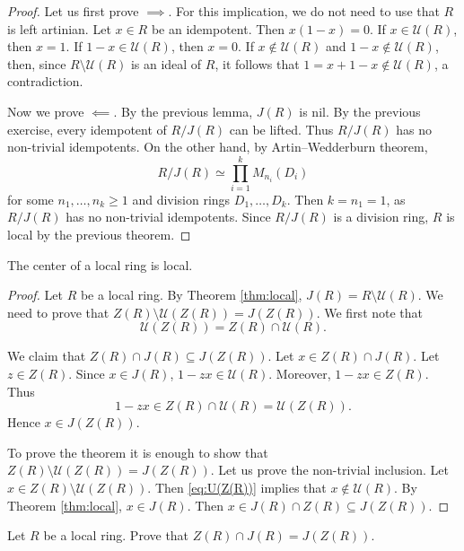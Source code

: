 \begin{proof}
    Let us first prove $\implies$. For this implication, we do not need to use that 
    $R$ is left artinian. Let $x\in R$ be an idempotent. Then $x(1-x)=0$. If $x\in\mathcal{U}(R)$, then 
    $x=1$. If $1-x\in\mathcal{U}(R)$, then $x=0$. If $x\not\in \mathcal{U}(R)$ and $1-x\not\in\mathcal{U}(R)$, 
    then, since $R\setminus\mathcal{U}(R)$ is an ideal of $R$, 
    it follows that 
    $1=x+1-x\not\in\mathcal{U}(R)$, a contradiction. 

    Now we prove $\impliedby$. By the previous lemma, $J(R)$ is nil. 
    By the previous exercise, every idempotent of $R/J(R)$ can be lifted. Thus $R/J(R)$ has 
    no non-trivial idempotents. On the other hand, by Artin--Wedderburn theorem, 
    \[
    R/J(R)\simeq\prod_{i=1}^kM_{n_i}(D_i)
    \]
    for some $n_1,\dots,n_k\geq1$ and division rings $D_1,\dots,D_k$. Then 
    $k=n_1=1$, as $R/J(R)$ has no non-trivial idempotents. Since $R/J(R)$ is a division ring, 
    $R$ is local by the previous theorem. 
\end{proof}

\begin{theorem}
    The center of a local ring is local. 
\end{theorem}

\begin{proof}
    Let $R$ be a local ring. By Theorem \ref{thm:local}, $J(R)=R\setminus\mathcal{U}(R)$.  
    We need to prove that $Z(R)\setminus\mathcal{U}(Z(R))=J(Z(R))$. 
    We first note that
    \begin{equation}
    \label{eq:U(Z(R))}
        \mathcal{U}(Z(R))=Z(R)\cap\mathcal{U}(R).
    \end{equation}
    
    We claim that $Z(R)\cap J(R)\subseteq J(Z(R))$.  
    Let $x\in Z(R)\cap J(R)$. Let $z\in Z(R)$. Since $x\in J(R)$, $1-zx\in\mathcal{U}(R)$.
    Moreover, $1-zx\in Z(R)$. Thus 
    \[
    1-zx\in Z(R)\cap\mathcal{U}(R)=\mathcal{U}(Z(R)).
    \]
    Hence $x\in J(Z(R))$. 

    To prove the theorem it is enough to show that 
    $Z(R)\setminus\mathcal{U}(Z(R))=J(Z(R))$. Let us prove the non-trivial inclusion. 
    Let $x\in Z(R)\setminus\mathcal{U}(Z(R))$.  Then 
    \eqref{eq:U(Z(R))} implies that 
    $x\not\in\mathcal{U}(R)$. 
    By Theorem \ref{thm:local}, 
    $x\in J(R)$. Then $x\in J(R)\cap Z(R)\subseteq J(Z(R))$. 
\end{proof}

\begin{exercise}
\label{eq:local_center}
    Let $R$ be a local ring. Prove that 
    $Z(R)\cap J(R)=J(Z(R))$.  
\end{exercise}

